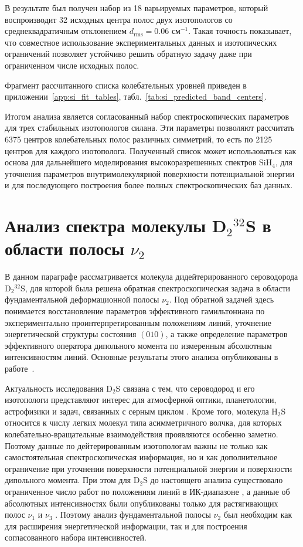 В результате был получен набор из 18 варьируемых параметров, который воспроизводит 32 исходных центра
полос двух изотопологов со среднеквадратичным отклонением $d_{\textrm{rms}}=0.06$ см$^{-1}$. Такая точность
показывает, что совместное использование экспериментальных данных и изотопических ограничений
позволяет устойчиво решить обратную задачу даже при ограниченном числе исходных полос.

Фрагмент рассчитанного списка колебательных уровней приведен в
приложении~\ref{app:si_fit_tables}, табл.~\ref{tab:si_predicted_band_centers}.

Итогом анализа является согласованный набор спектроскопических параметров для трех стабильных 
изотопологов силана. Эти параметры позволяют рассчитать 6375 центров колебательных полос различных
симметрий, то есть по 2125 центров для каждого изотополога. Полученный список может использоваться как
основа для дальнейшего моделирования высокоразрешенных спектров SiH$_4$, для уточнения параметров
внутримолекулярной поверхности потенциальной энергии и для последующего построения более полных
спектроскопических баз данных.

\section{Анализ спектра молекулы D$_2{}^{32}$S в области полосы $\nu_2$}\label{sec:ch2/D2S}

В данном параграфе рассматривается молекула дидейтерированного сероводорода D$_2{}^{32}$S, для
которой была решена обратная спектроскопическая задача в области фундаментальной деформационной
полосы $\nu_2$. Под обратной задачей здесь понимается восстановление параметров эффективного
гамильтониана по экспериментально проинтерпретированным положениям линий, уточнение энергетической
структуры состояния $(010)$, а также определение параметров эффективного оператора дипольного момента
по измеренным абсолютным интенсивностям линий. Основные результаты этого анализа опубликованы в
работе~\cite{d2s_sydow2019}.

Актуальность исследования D$_2$S связана с тем, что сероводород и его изотопологи представляют интерес
для атмосферной оптики, планетологии, астрофизики и задач, связанных с серным циклом
\cite{h2s_farquhar2000_science,h2s_farquhar2000_nature,h2s_thaddeus1972,h2s_vastel2003}. Кроме того,
молекула H$_2$S относится к числу легких молекул типа асимметричного волчка, для которых
колебательно-вращательные взаимодействия проявляются особенно заметно. Поэтому данные по
дейтерированным изотопологам важны не только как самостоятельная спектроскопическая информация, но и
как дополнительное ограничение при уточнении поверхности потенциальной энергии и поверхности
дипольного момента. При этом для D$_2$S до настоящего анализа существовало ограниченное число работ по
положениям линий в ИК-диапазоне \cite{d2s_gillis1985,d2s_camy1985,d2s_camy1988}, а данные об
абсолютных интенсивностях были опубликованы только для растягивающих полос $\nu_1$ и $\nu_3$
\cite{d2s_lamouroux2008}. Поэтому анализ фундаментальной полосы $\nu_2$ был необходим как для
расширения энергетической информации, так и для построения согласованного набора интенсивностей.

